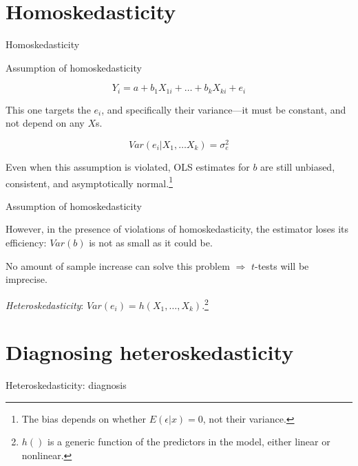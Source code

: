 \documentclass[12pt,english,pdf,xcolor=dvipsnames,aspectratio=169,handout]{beamer}\usepackage[]{graphicx}\usepackage[]{xcolor}
\begin{document}
\section{Homoskedasticity}

\begin{frame}
\begin{center}
    \Huge Homoskedasticity
\end{center}
\end{frame}


\begin{frame}{Assumption of homoskedasticity}

\begin{equation}
Y_i = a + b_1X_{1i} + \dots + b_kX_{ki} + e_i
\end{equation}

This one targets the $e_i$, and specifically their variance---it must be constant, and not depend on any $X$s.

\begin{equation}
Var(e_i | X_1, \dots X_k) = \sigma_e^2
\end{equation}

Even when this assumption is violated, OLS estimates for $b$ are still unbiased, consistent, and asymptotically normal.\footnote{The bias depends on whether $E(\epsilon|x)=0$, not their variance.}

\end{frame}



\begin{frame}{Assumption of homoskedasticity}

However, in the presence of violations of homoskedasticity, the estimator loses its efficiency: $Var(b)$ is not as small as it could be.\bigskip

No amount of sample increase can solve this problem $\Rightarrow$ $t$-tests will be imprecise.\bigskip

\textit{Heteroskedasticity}: $Var(e_i) = h(X_1, \dots, X_k)$.\footnote{$h()$ is a generic function of the predictors in the model, either linear or nonlinear.}

\end{frame}



\section{Diagnosing heteroskedasticity}

\begin{frame}
\begin{center}
    \Huge Heteroskedasticity: diagnosis
\end{center}
\end{frame}
\end{document}
